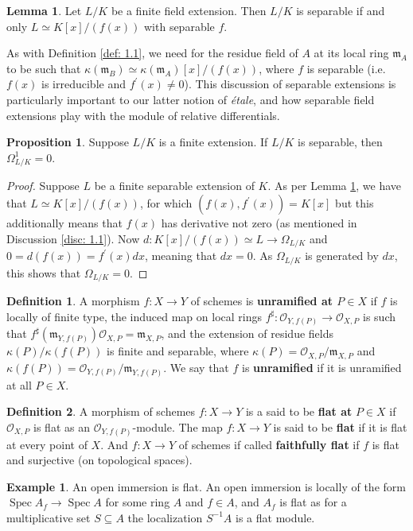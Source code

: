 \documentclass[oneside]{amsart}
\theoremstyle{definition}
\newtheorem{defi}{Definition}[section]
\newtheorem{lemma}{Lemma}[section]
\newtheorem{prop}{Proposition}[section]
\DeclareMathOperator{\spec}{Spec}
\newtheorem{ex}{Example}[section]
\begin{document}
\begin{lemma}\label{lem: 2.1} Let $L/K$ be a finite field extension. Then $L/K$ is separable if and only $L \simeq K[x]/(f(x))$ with separable $f$.
\end{lemma}
As with Definition \ref{def: 1.1}, we need for the residue field of $A$ at its local ring $\mathfrak m_A$ to be such that $\kappa (\mathfrak m_B)  \simeq \kappa(\mathfrak m_A) [x]/(f(x))$, where $f$ is separable (i.e. $f(x)$ is irreducible and $f^\prime (x) \neq 0$). This discussion of separable extensions is particularly important to our latter notion of \textit{\'etale}, and how separable field extensions play with the module of relative differentials.
\begin{prop} \label{prop: 2.3} Suppose $L/K$ is a finite extension. If $L/K$ is separable, then $\Omega_{L/K}^1  = 0$.
\end{prop}
\begin{proof} Suppose $L$ be a finite separable extension of $K$. As per Lemma \ref{lem: 2.1}, we have that $L \simeq K[x]/(f(x))$, for which $(f(x), f^\prime(x)) = K[x]$ but this additionally means that $f(x)$ has derivative not zero (as mentioned in Discussion \ref{disc: 1.1}). Now $d \colon K[x] /(f(x)) \simeq L \to \Omega_{L/K}$ and $ 0 = d (f(x)) = f^\prime (x) dx$, meaning that $dx = 0$. As $\Omega_{L/K}$ is generated by $dx$, this shows that $\Omega_{L/K} = 0$.  
\end{proof}
\begin{defi}
A morphism $f \colon X \to Y$ of schemes is \textbf{unramified at $P \in X$} if $f$ is locally of finite type, the induced map on local rings $f^\sharp \colon \mathscr O _{Y, f(P)} \to \mathscr O _{X, P}$ is such that $f^\sharp (\mathfrak m_{Y, f(P)} ) \mathscr O_{X,P} = \mathfrak m_{X, P} $, and the extension of residue fields $\kappa(P)/\kappa(f(P))$ is finite and separable, where $\kappa(P) = \mathscr O_{X,P}/\mathfrak m _{X,P}$ and $\kappa (f(P)) = \mathscr O_{Y, f(P)} /\mathfrak m_{Y, f(P)}$. We say that $f$ is \textbf{unramified} if it is unramified at all $P \in X$. 
\end{defi}
 
\begin{defi}
A morphism of schemes $f \colon X \to Y$ is a said to be \textbf{flat at} $P \in X$ if $\mathscr O_{X, P}$ is flat as an $\mathscr O_{Y, f(P)}$-module. The map $f\colon X \to Y$ is said to be \textbf{flat} if it is flat at every point of $X$. And $f \colon X \to Y$ of schemes if called \textbf{faithfully flat} if $f$ is flat and surjective (on topological spaces). 
\end{defi}
\begin{ex} An open immersion is flat. An open immersion is locally of the form $\spec A_f \to \spec A$ for some ring $A$ and $f \in A$, and $A_f$ is flat as for a multiplicative set $S \subseteq A$ the localization $S^{-1} A$ is a flat module. 
\end{ex}
\end{document}
